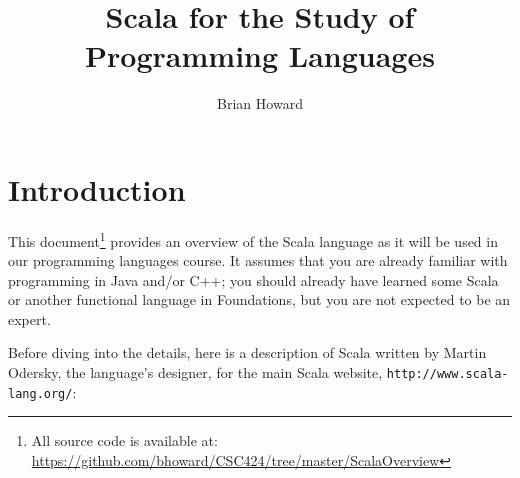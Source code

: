 \documentclass[11pt]{article}
\title{Scala for the Study of Programming Languages}
\author{Brian Howard}
\begin{document}
\maketitle
\section{Introduction}
This document\footnote{All source code is available at:
\url{https://github.com/bhoward/CSC424/tree/master/ScalaOverview}}
provides an overview of the Scala language as it will
be used in our programming languages course. It assumes that you
are already familiar with programming in Java and/or C++; you should
already have learned some Scala or another functional language in
Foundations, but you are not expected to be an expert.

Before diving into the details, here is a description of Scala
written by Martin Odersky, the language's designer, for the main
Scala website, \texttt{http://www.scala-lang.org/}:
\end{document}
